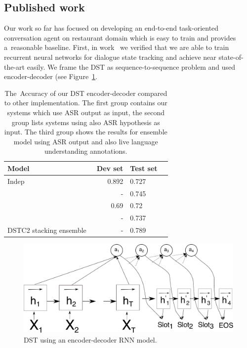 \documentclass[11pt]{article}
\begin{document}
\subsection{Published work}
Our work so far has focused on developing an end-to-end task-oriented conversation agent on restaurant domain which is easy to train and provides a~reasonable baseline.
First, in work~\cite{platek_recurrent_2016} we verified that we are able to train recurrent neural networks for dialogue state tracking and achieve near state-of-the-art easily. 
We frame the DST as sequence-to-sequence problem and used encoder-decoder (see Figure~\ref{fig:dst_seq2seq}. 

\begin{table}[tb]\vspace{-1mm}
\begin{center}
\begin{tabular}{l@{\quad}rll}
\hline
Model & Dev set & Test set\\
[2pt] \hline\rule{0pt}{12pt}
    Indep  &   0.892 & 0.727 \\
\hline
    \cite{vodolan_hybrid_2015} & - & 0.745 \\
    \cite{zilka_incremental_2015} & 0.69 & 0.72 \\
    \cite{henderson2013deep} & - & 0.737 \\
\hline
    DSTC2 stacking ensemble~\cite{henderson2014second} & - & 0.789 \\
\hline
\end{tabular}
\caption{The~Accuracy of our DST encoder-decoder compared to other implementation. The first group contains our systems which use ASR output as input, the second group lists systems using also ASR hypothesis as input. The third group shows the results for ensemble model using ASR output and also live language understanding annotations.}
\end{center}
\label{tab:dstc}
\end{table}

\begin{figure}[htpb]
    \centering
    \includegraphics[width=1.0\linewidth]{dst_seq2seq}
    \caption{DST using an encoder-decoder RNN model.}
    \label{fig:dst_seq2seq}
\end{figure}
\end{document}
